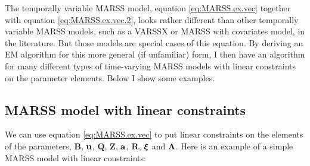 \documentclass[]{article}
\def\xixi{\mbox{\boldmath $\xi$}}
\def\LAM{\mbox{\boldmath $\Lambda$}}
\def\UPS{\mbox{\boldmath $\Upsilon$}}
\def\XI{\mbox{\boldmath $\Xi$}}
\def\BB{\mbox{$\mathbf B$}}	\def\bb{\mbox{$\mathbf b$}} \def\Bb{\mbox{$\mathbf J$}} \def\Ba{\mbox{$\mathbf L$}} \def\Bm{\UPS}
\def\QQ{\mbox{$\mathbf Q$}}	 \def\qq{\mbox{$\mathbf q$}} \def\Qb{\mbox{$\mathbf G$}}  \def\Qm{\mathbb{Q}}
\def\RR{\mbox{$\mathbf R$}}	 \def\rr{\mbox{$\mathbf r$}} \def\Rb{\mbox{$\mathbf H$}}	\def\Rm{\mathbb{R}}
\def\ZZ{\mbox{$\mathbf Z$}}	\def\zz{\mbox{$\mathbf z$}}	\def\Zb{\mbox{$\mathbf M$}} \def\Za{\mbox{$\mathbf N$}} \def\Zm{\XI}
\begin{document}
The temporally variable MARSS model, equation \ref{eq:MARSS.ex.vec} together with equation \ref{eq:MARSS.ex.vec.2}, looks rather different than other temporally variable MARSS models, such as a VARSSX or MARSS with covariates model, in the literature.  But those models are special cases of this equation.  By deriving an EM algorithm for this more general (if unfamiliar) form, I then have an algorithm for many different types of time-varying MARSS models with linear constraints on the parameter elements.  Below I show some examples. 

\subsection{MARSS model with linear constraints}
We can use equation \ref{eq:MARSS.ex.vec} to put linear constraints on the elements of the parameters, $\BB$, $\uu$, $\QQ$, $\ZZ$, $\aa$, $\RR$, $\xixi$ and $\LAM$. Here is an example of a simple MARSS model with linear constraints:
\end{document}
